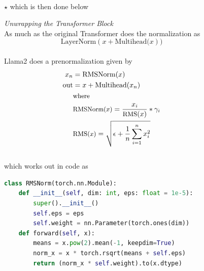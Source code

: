 \documentclass[12pt]{article}
\newcommand{\customtext}[3]{%
    \vspace{#2} %
    \fontsize{13}{8}\textcolor{#1}{\textit{#3}}%
}
\newcommand{\sidecite}[1]{\textsuperscript{\textcolor{blue}{\textbf{\scriptsize#1}}}}
\newcommand{\maincitecount}{\sidecite{\stepcounter{maincite}\themaincite}}
\begin{document}
\pagebreak
\begin{figure}[!htb]
    \begin{minipage}[t]{0.65\textwidth}
$\star$ which is then done below{\maincitecount}\\
\customtext{xtitle}{0em}{Unwrapping the Transformer Block}\\
As much as the original Transformer does the normalization as
\vspace{-1em}
$$\text{LayerNorm}(x  + \text{Multihead(}x))$$
\vspace{-2.7em}\\
Llama2 does a prenormalization given by
\vspace{-1em}
\begin{align*}
    x_n & = \text{RMSNorm}(x)\\
    \text{out} & = x  + \text{Multihead(}x_n)\\
    & \text{\small where}\\
    & \text{\small RMSNorm($x$)}=\frac{x_i}{\text{\small RMS}(x)}*\gamma_i\\
    & \text{\small RMS($x$)} = \sqrt{\epsilon+\frac{1}{n}\sum_{i=1}^nx_i^2}
\end{align*}
\vspace{-1.5em}\\
which works out in code as 
\begin{lstlisting}[language=python,style=python,basicstyle=\ttfamily\footnotesize]
class RMSNorm(torch.nn.Module):
    def __init__(self, dim: int, eps: float = 1e-5):
        super().__init__()
        self.eps = eps
        self.weight = nn.Parameter(torch.ones(dim))
    def forward(self, x):
        means = x.pow(2).mean(-1, keepdim=True)
        norm_x = x * torch.rsqrt(means + self.eps)
        return (norm_x * self.weight).to(x.dtype)


\end{lstlisting}
\end{minipage}
\end{figure}
\end{document}
